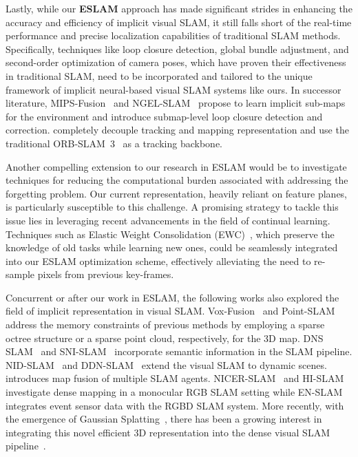 Lastly, while our \textbf{ESLAM} approach has made significant strides in enhancing the accuracy and efficiency of implicit visual SLAM, it still falls short of the real-time performance and precise localization capabilities of traditional SLAM methods. Specifically, techniques like loop closure detection, global bundle adjustment, and second-order optimization of camera poses, which have proven their effectiveness in traditional SLAM, need to be incorporated and tailored to the unique framework of implicit neural-based visual SLAM systems like ours. In successor literature, MIPS-Fusion~\citep{tang2023mips} and NGEL-SLAM~\citep{mao2023ngel} propose to learn implicit sub-maps for the environment and introduce submap-level loop closure detection and correction. \cite{haghighi2023neural} completely decouple tracking and mapping representation and use the traditional ORB-SLAM~3~\citep{campos2021orb} as a tracking backbone.

Another compelling extension to our research in ESLAM would be to investigate techniques for reducing the computational burden associated with addressing the forgetting problem. Our current representation, heavily reliant on feature planes, is particularly susceptible to this challenge. A promising strategy to tackle this issue lies in leveraging recent advancements in the field of continual learning. Techniques such as  Elastic Weight Consolidation (EWC)~\citep{kirkpatrick2017overcoming}, which preserve the knowledge of old tasks while learning new ones, could be seamlessly integrated into our ESLAM optimization scheme, effectively alleviating the need to re-sample pixels from previous key-frames.

Concurrent or after our work in ESLAM, the following works also explored the field of implicit representation in visual SLAM. Vox-Fusion~\citep{yang2022vox} and Point-SLAM~\citep{sandstrom2023point} address the memory constraints of previous methods by employing a sparse octree structure or a sparse point cloud, respectively, for the 3D map. DNS SLAM~\citep{li2023dns} and SNI-SLAM~\citep{zhu2023sni} incorporate semantic information in the SLAM pipeline. NID-SLAM~\citep{xu2024nid} and DDN-SLAM~\citep{li2024ddn} extend the visual SLAM to dynamic scenes. \cite{liu2023efficient} introduces map fusion of multiple SLAM agents. NICER-SLAM~\citep{zhu2023nicer} and HI-SLAM~\citep{zhang2023hi} investigate dense mapping in a monocular RGB SLAM setting while EN-SLAM~\citep{qu2023implicit} integrates event sensor data with the RGBD SLAM system. More recently, with the emergence of Gaussian Splatting~\citep{kerbl20233d}, there has been a growing interest in integrating this novel efficient 3D representation into the dense visual SLAM pipeline~\citep{matsuki2023gaussian,yan2023gs,yugay2023gaussian,keetha2023splatam,huang2023photo}.

